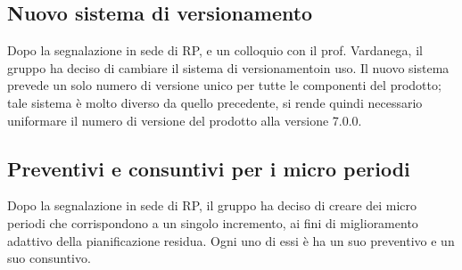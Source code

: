     \subsection{Nuovo sistema di versionamento}
    Dopo la segnalazione in sede di RP, e un colloquio con il prof. Vardanega, il gruppo ha deciso di cambiare il sistema di versionamento\glosp in uso. Il nuovo sistema prevede un solo numero di versione unico per tutte le componenti del prodotto\glo; tale sistema è molto diverso da quello precedente, si rende quindi necessario uniformare il numero di versione del prodotto alla versione 7.0.0.
    
    \subsection{Preventivi e consuntivi per i micro periodi}
    Dopo la segnalazione in sede di RP, il gruppo ha deciso di creare dei micro periodi che corrispondono a un singolo incremento, ai fini di miglioramento adattivo della pianificazione residua. Ogni uno di essi è ha un suo preventivo e un suo consuntivo.

